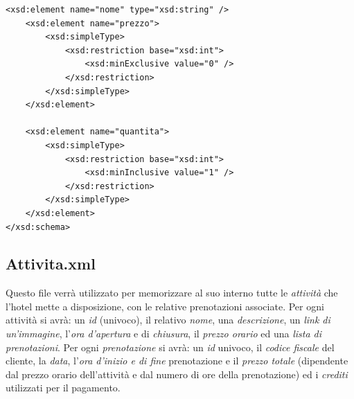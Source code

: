 \documentclass [a4paper, 12pt]{book}
\begin{document}
\begin{lstlisting}[style=XML]
    <xsd:element name="nome" type="xsd:string" />
    <xsd:element name="prezzo">
        <xsd:simpleType>
            <xsd:restriction base="xsd:int">
                <xsd:minExclusive value="0" />
            </xsd:restriction>
        </xsd:simpleType>
    </xsd:element>
    
    <xsd:element name="quantita">
        <xsd:simpleType>
            <xsd:restriction base="xsd:int">
                <xsd:minInclusive value="1" />
            </xsd:restriction>
        </xsd:simpleType>
    </xsd:element>
</xsd:schema>
\end{lstlisting}
\subsection{Attivita.xml}
Questo file verrà utilizzato per memorizzare al suo interno tutte le \textit{attività} che l'hotel mette a disposizione, con le relative prenotazioni associate. Per ogni attività si avrà: un \textit{id} (univoco), il relativo \textit{nome}, una \textit{descrizione}, un \textit{link di un'immagine}, l'\textit{ora d'apertura} e di \textit{chiusura}, il \textit{prezzo orario} ed una \textit{lista di prenotazioni}. Per ogni \textit{prenotazione} si avrà: un \textit{id} univoco, il \textit{codice fiscale} del cliente, la \textit{data}, l'\textit{ora d'inizio e di fine} prenotazione e il \textit{prezzo totale} (dipendente dal prezzo orario dell'attività e dal numero di ore della prenotazione) ed i \textit{crediti} utilizzati per il pagamento.
\end{document}
